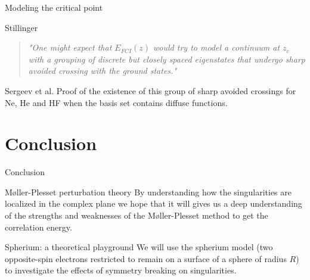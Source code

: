 \documentclass[xcolor=x11names,compress]{beamer}
\renewcommand{\(}{\begin{columns}}
\renewcommand{\)}{\end{columns}}
\newcommand{\<}[1]{\begin{column}{#1}}
\renewcommand{\>}{\end{column}}
\begin{document}
\begin{frame}{Modeling the critical point}

\pause[1]

\begin{beamerboxesrounded}[scheme=foncé]{\centering Stillinger}
\begin{quote}
    \textit{"One might expect that $E_{FCI}(z) $ would try to model a continuum at $z_c$ with a grouping of discrete but closely spaced eigenstates that undergo sharp avoided crossing with the ground states."}
\end{quote}
\end{beamerboxesrounded}

\vspace{0.5cm}

\pause[2]

\begin{beamerboxesrounded}[scheme=foncé]{\centering Sergeev et al.}
Proof of the existence of this group of sharp avoided crossings for Ne, He and HF when the basis set contains diffuse functions.
\end{beamerboxesrounded}
    
\end{frame}

\section{Conclusion}

\begin{frame}{Conclusion}

\pause[1]

\begin{beamerboxesrounded}[scheme=foncé]{\centering Møller-Plesset perturbation theory}
By understanding how the singularities are localized in the complex plane we hope that it will gives us a deep understanding of the strengths and weaknesses of the Møller-Plesset method to get the correlation energy.
\end{beamerboxesrounded}

\vspace{0.5cm}

\pause[2]

\begin{beamerboxesrounded}[scheme=foncé]{\centering Spherium: a theoretical playground}
We will use the spherium model (two opposite-spin electrons restricted to remain on a surface of a sphere of radius $R$) to investigate the effects of symmetry breaking on singularities.
\end{beamerboxesrounded}
    
\end{frame}
\end{document}
